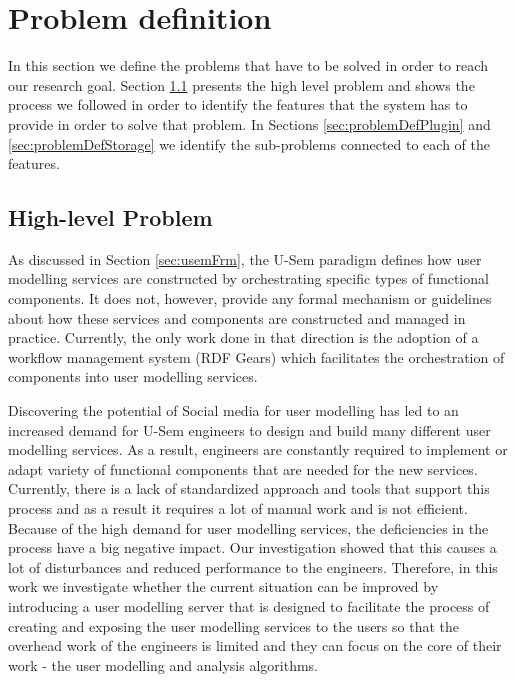 
\chapter{Problem definition}
\label{cha:problemDef}

In this section we define the problems that have to be solved in order to reach our research goal. Section \ref{sec:mainProblem} presents the high level problem and shows the process we followed in order to identify the features that the system has to provide in order to solve that problem. In Sections \ref{sec:problemDefPlugin} and \ref{sec:problemDefStorage} we identify the sub-problems connected to each of the features. 

\section{High-level Problem}
\label{sec:mainProblem}

As discussed in Section \ref{sec:usemFrm}, the U-Sem paradigm defines how user modelling services are constructed by orchestrating specific types of functional components. It does not, however, provide any formal mechanism or guidelines about how these services and components are constructed and managed in practice. Currently, the only work done in that direction is the adoption of a workflow management system (RDF Gears) which facilitates the orchestration of components into user modelling services. 

Discovering the potential of Social media for user modelling \cite{brusilovsky2007adaptive} has led to an increased demand for U-Sem engineers to design and build many different user modelling services. As a result, engineers are constantly required to implement or adapt variety of functional components that are needed for the new services. Currently, there is a lack of standardized approach and tools that support this process and as a result it requires a lot of manual work and is not efficient. Because of the high demand for user modelling services, the deficiencies in the process have a big negative impact. Our investigation showed that this causes a lot of disturbances and reduced performance to the engineers. Therefore, in this work we investigate whether the current situation can be improved by introducing a user modelling server that is designed to facilitate the process of creating and exposing the user modelling services to the users so that the overhead work of the engineers is limited and they can focus on the core of their work - the user modelling and analysis algorithms.

